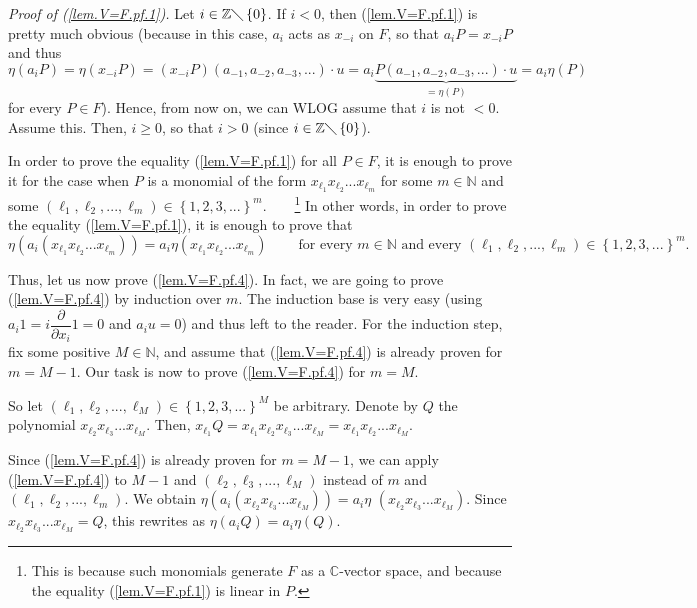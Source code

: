 \documentclass[etingof-lie.tex]{subfiles}
\begin{document}
\textit{Proof of (\ref{lem.V=F.pf.1}).} Let $i\in\mathbb{Z}\diagdown\left\{
0\right\}  $. If $i<0$, then (\ref{lem.V=F.pf.1}) is pretty much obvious
(because in this case, $a_{i}$ acts as $x_{-i}$ on $F$, so that $a_{i}%
P=x_{-i}P$ and thus%
\[
\eta\left(  a_{i}P\right)  =\eta\left(  x_{-i}P\right)  =\left(
x_{-i}P\right)  \left(  a_{-1},a_{-2},a_{-3},...\right)  \cdot u=a_{i}%
\underbrace{P\left(  a_{-1},a_{-2},a_{-3},...\right)  \cdot u}_{=\eta\left(
P\right)  }=a_{i}\eta\left(  P\right)
\]
for every $P\in F$). Hence, from now on, we can WLOG assume that $i$ is not
$<0$. Assume this. Then, $i\geq0$, so that $i>0$ (since $i\in\mathbb{Z}%
\diagdown\left\{  0\right\}  $).

In order to prove the equality (\ref{lem.V=F.pf.1}) for all $P\in F$, it is
enough to prove it for the case when $P$ is a monomial of the form
$x_{\ell_{1}}x_{\ell_{2}}...x_{\ell_{m}}$ for some $m\in\mathbb{N}$ and some
$\left(  \ell_{1},\ell_{2},...,\ell_{m}\right)  \in\left\{  1,2,3,...\right\}
^{m}$.\ \ \ \ \footnote{This is because such monomials generate $F$ as a
$\mathbb{C}$-vector space, and because the equality (\ref{lem.V=F.pf.1}) is
linear in $P$.} In other words, in order to prove the equality
(\ref{lem.V=F.pf.1}), it is enough to prove that%
\begin{equation}
\eta\left(  a_{i}\left(  x_{\ell_{1}}x_{\ell_{2}}...x_{\ell_{m}}\right)
\right)  =a_{i}\eta\left(  x_{\ell_{1}}x_{\ell_{2}}...x_{\ell_{m}}\right)
\ \ \ \ \ \ \ \ \ \ \text{for every }m\in\mathbb{N}\text{ and every }\left(
\ell_{1},\ell_{2},...,\ell_{m}\right)  \in\left\{  1,2,3,...\right\}  ^{m}.
\label{lem.V=F.pf.4}%
\end{equation}


Thus, let us now prove (\ref{lem.V=F.pf.4}). In fact, we are going to prove
(\ref{lem.V=F.pf.4}) by induction over $m$. The induction base is very easy
(using $a_{i}1=i\dfrac{\partial}{\partial x_{i}}1=0$ and $a_{i}u=0$) and thus
left to the reader. For the induction step, fix some positive $M\in\mathbb{N}%
$, and assume that (\ref{lem.V=F.pf.4}) is already proven for $m=M-1$. Our
task is now to prove (\ref{lem.V=F.pf.4}) for $m=M$.

So let $\left(  \ell_{1},\ell_{2},...,\ell_{M}\right)  \in\left\{
1,2,3,...\right\}  ^{M}$ be arbitrary. Denote by $Q$ the polynomial
$x_{\ell_{2}}x_{\ell_{3}}...x_{\ell_{M}}$. Then, $x_{\ell_{1}}Q=x_{\ell_{1}%
}x_{\ell_{2}}x_{\ell_{3}}...x_{\ell_{M}}=x_{\ell_{1}}x_{\ell_{2}}%
...x_{\ell_{M}}$.

Since (\ref{lem.V=F.pf.4}) is already proven for $m=M-1$, we can apply
(\ref{lem.V=F.pf.4}) to $M-1$ and $\left(  \ell_{2},\ell_{3},...,\ell
_{M}\right)  $ instead of $m$ and $\left(  \ell_{1},\ell_{2},...,\ell
_{m}\right)  $. We obtain $\eta\left(  a_{i}\left(  x_{\ell_{2}}x_{\ell_{3}%
}...x_{\ell_{M}}\right)  \right)  =a_{i}\eta$ $\left(  x_{\ell_{2}}x_{\ell
_{3}}...x_{\ell_{M}}\right)  $. Since $x_{\ell_{2}}x_{\ell_{3}}...x_{\ell_{M}%
}=Q$, this rewrites as $\eta\left(  a_{i}Q\right)  =a_{i}\eta\left(  Q\right)
$.
\end{document}

